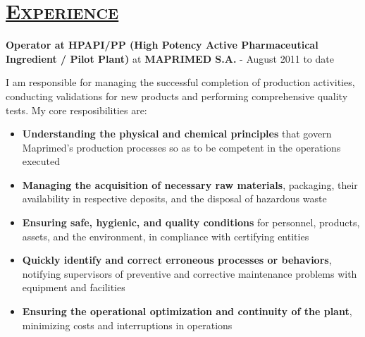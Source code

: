 \documentclass{resume} %
\begin{document}
\section*{\textsc{\underline{Experience}}}


{\bf Operator at HPAPI/PP (High Potency Active Pharmaceutical Ingredient / Pilot Plant)} at {\bf MAPRIMED S.A.} - {\textcolor{light-gray}{\small  August 2011 to date}}

\vspace{-5px}I am responsible for managing the successful completion of production activities, conducting validations for new products and performing comprehensive quality tests. My core resposibilities are:

\begin{itemize}[leftmargin=1cm]
  \setlength\itemsep{-7px}
  \item \textbf{Understanding the physical and chemical principles} that govern Maprimed's production processes so as to be competent in the operations executed
  \item \textbf{Managing the acquisition of necessary raw materials}, packaging, their availability in respective deposits, and the disposal of hazardous waste
  \item \textbf{Ensuring safe, hygienic, and quality conditions} for personnel, products, assets, and the environment, in compliance with certifying entities
  \item \textbf{Quickly identify and correct erroneous processes or behaviors}, notifying supervisors of preventive and corrective maintenance problems with equipment and facilities
  \item \textbf{Ensuring the operational optimization and continuity of the plant}, minimizing costs and interruptions in operations
\end{itemize}
\end{document}
